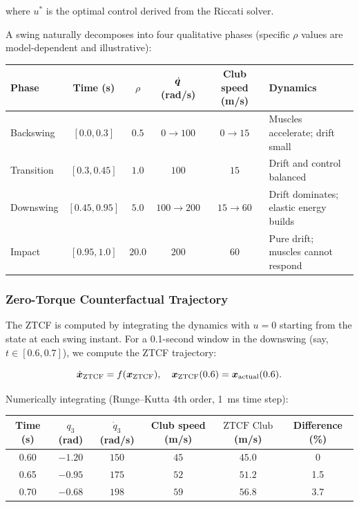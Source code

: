 where $u^*$ is the optimal control derived from the Riccati solver.

A swing naturally decomposes into four qualitative phases (specific $\rho$ values
are model-dependent and illustrative):

\begin{table}[h]
\centering
\begin{tabular}{@{}lccccl@{}}
\toprule
\textbf{Phase} & \textbf{Time (s)} & $\rho$ & $\dot{\bm{q}}$ (rad/s) & Club speed (m/s) & \textbf{Dynamics} \\
\midrule
Backswing & $[0.0, 0.3]$ & $0.5$ & $0 \to 100$ & $0 \to 15$ & Muscles accelerate; drift small \\
Transition & $[0.3, 0.45]$ & $1.0$ & $100$ & $15$ & Drift and control balanced \\
Downswing & $[0.45, 0.95]$ & $5.0$ & $100 \to 200$ & $15 \to 60$ & Drift dominates; elastic energy builds \\
Impact & $[0.95, 1.0]$ & $20.0$ & $200$ & $60$ & Pure drift; muscles cannot respond \\
\bottomrule
\end{tabular}
\end{table}

\subsubsection{Zero-Torque Counterfactual Trajectory}

The ZTCF is computed by integrating the dynamics with $u = 0$ starting from the
state at each swing instant. For a 0.1-second window in the downswing (say, $t \in [0.6, 0.7]$),
we compute the ZTCF trajectory:

\begin{equation}
\dot{\bm{x}}_{\text{ZTCF}} = f(\bm{x}_{\text{ZTCF}}), \quad \bm{x}_{\text{ZTCF}}(0.6) = \bm{x}_{\text{actual}}(0.6).
\end{equation}

Numerically integrating (Runge--Kutta 4th order, 1~ms time step):

\begin{table}[h]
\centering
\begin{tabular}{@{}cccccc@{}}
\toprule
\textbf{Time (s)} & $q_3$ (rad) & $\dot q_3$ (rad/s) & Club speed (m/s) & $\text{ZTCF Club}$ (m/s) & Difference (\%) \\
\midrule
0.60 & $-1.20$ & $150$ & $45$ & $45.0$ & 0 \\
0.65 & $-0.95$ & $175$ & $52$ & $51.2$ & 1.5 \\
0.70 & $-0.68$ & $198$ & $59$ & $56.8$ & 3.7 \\
\bottomrule
\end{tabular}
\end{table}

